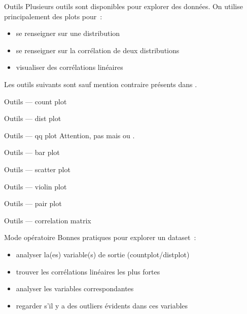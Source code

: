 \begin{frame}{Outils}
  Plusieurs outils sont disponibles pour explorer des données. On
  utilise principalement des plots pour :
  \begin{itemize}
  \item se renseigner sur une distribution
  \item se renseigner sur la corrélation de deux distributions
  \item visualiser des corrélations linéaires
  \end{itemize}
  Les outils suivants sont sauf mention contraire présents dans
  .
\end{frame}

\begin{frame}{Outils — count plot}
\end{frame}

\begin{frame}{Outils — dist plot}
\end{frame}

\begin{frame}{Outils — qq plot}
  Attention, pas 
  mais
  ou
  .
\end{frame}

\begin{frame}{Outils — bar plot}
\end{frame}

\begin{frame}{Outils — scatter plot}
\end{frame}

\begin{frame}{Outils — violin plot}
\end{frame}

\begin{frame}{Outils — pair plot}
\end{frame}

\begin{frame}{Outils — correlation matrix}
\end{frame}

\begin{frame}{Mode opératoire}
  Bonnes pratiques pour explorer un dataset :
  \begin{itemize}[<+->]
  \item analyser la(es) variable(s) de sortie (countplot/distplot)
  \item trouver les corrélations linéaires les plus fortes
  \item analyser les variables correspondantes
  \item regarder s'il y a des outliers évidents dans ces variables
  \end{itemize}
\end{frame}
